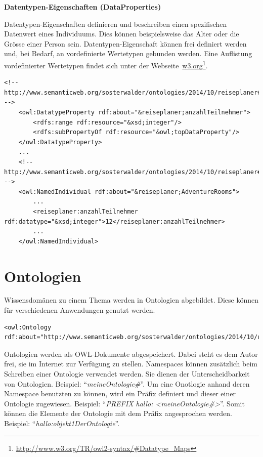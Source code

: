 \textbf{Datentypen-Eigenschaften (DataProperties)}

Datentypen-Eigenschaften definieren und beschreiben einen spezifischen Datenwert eines Individuums. Dies können beispielsweise das Alter oder die Grösse einer Person sein. Datentypen-Eigenschaft können frei definiert werden und, bei Bedarf, an vordefinierte Wertetypen gebunden werden. Eine Auflistung vordefinierter Wertetypen findet sich unter der Webseite~\href{http://www.w3.org/TR/owl2-syntax/\#Datatype_Maps}{w3.org}\footnote{\url{http://www.w3.org/TR/owl2-syntax/\#Datatype_Maps}}.

\begin{lstlisting}[caption={Beispiel der Datentypen-Eigenschaft \textit{anzahlTeilnehmer} und deren Anwendung bei einem Individuum}]
    <!-- http://www.semanticweb.org/sosterwalder/ontologies/2014/10/reiseplaner#anzahlTeilnehmer -->
    <owl:DatatypeProperty rdf:about="&reiseplaner;anzahlTeilnehmer">
        <rdfs:range rdf:resource="&xsd;integer"/>
        <rdfs:subPropertyOf rdf:resource="&owl;topDataProperty"/>
    </owl:DatatypeProperty>
    ...
    <!-- http://www.semanticweb.org/sosterwalder/ontologies/2014/10/reiseplaner#AdventureRooms -->
    <owl:NamedIndividual rdf:about="&reiseplaner;AdventureRooms">
        ...
        <reiseplaner:anzahlTeilnehmer rdf:datatype="&xsd;integer">12</reiseplaner:anzahlTeilnehmer>
        ...
    </owl:NamedIndividual>
\end{lstlisting}

\newpage

\section{Ontologien}
\label{sec:owl_owl_Ontologien}

Wissensdomänen zu einem Thema werden in Ontologien abgebildet. Diese können für verschiedenen Anwendungen genutzt werden.

\begin{lstlisting}[caption={Beispiel einer Definition einer Ontologie}]
    <owl:Ontology rdf:about="http://www.semanticweb.org/sosterwalder/ontologies/2014/10/reiseplaner"/>
\end{lstlisting}

Ontologien werden als OWL-Dokumente abgespeichert. Dabei steht es dem Autor frei, sie im Internet zur Verfügung zu stellen.
Namespaces können zusätzlich beim Schreiben einer Ontologie verwendet werden. Sie dienen der Unterscheidbarkeit von Ontologien. Beispiel: ``\textit{meineOntologie\#}''. Um eine Onotlogie anhand deren Namespace benutzten zu können, wird ein Präfix definiert und dieser einer Ontologie zugewiesen. Beispiel: ``\textit{PREFIX hallo: <meineOntologie\#>}''. Somit können die Elemente der Ontologie mit dem Präfix angesprochen werden. Beispiel: ``\textit{hallo:objekt1DerOntologie}''.

